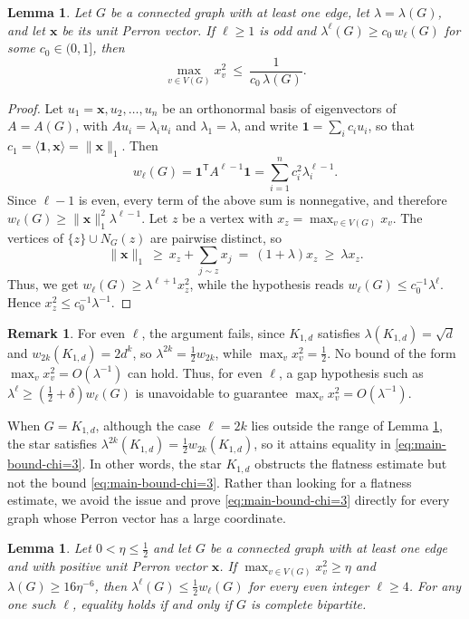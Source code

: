 \documentclass[11pt, a4paper]{article}
\newtheorem{lemma}[theorem]{Lemma}
\theoremstyle{definition}
\newtheorem{remark}{Remark}
\theoremstyle{plain}
\renewcommand{\le}{\leqslant}
\renewcommand{\ge}{\geqslant}
\newcommand{\one}{\mathbf{1}}
\begin{document}
\begin{lemma} 
\label{lem:flat-odd}
Let $G$ be a connected graph with at least one edge, let $\lambda =\lambda (G)$, and let $\bm{x}$ be its unit
Perron vector. If $\ell \ge 1$ is odd and
$\lambda^{\ell} (G)\ge c_0\,w_\ell (G)$ for some
$c_0\in (0,1]$, then
\[
  \max_{v\in V(G)}x_v^2
  \ \le \ \frac{1}{c_0\,\lambda (G)} .
\]
\end{lemma}

\begin{proof}
Let $u_1=\bm{x},u_2,\ldots ,u_n$ be an orthonormal basis
of eigenvectors of $A=A(G)$, with $Au_i=\lambda_iu_i$ and
$\lambda_1=\lambda$, and write $\one =\sum_i c_iu_i$, so
that $c_1=\langle \one ,\bm{x}\rangle
=\lVert \bm{x}\rVert_1$. Then 
\[
  w_\ell (G)=\one^{\mathsf T}A^{\ell -1}\one
  =\sum_{i=1}^{n}c_i^{2}\lambda_i^{\ell -1}.
\] 
Since $\ell -1$ is even, every term of the above sum is
nonnegative, and therefore
$w_\ell (G)\ge \lVert \bm{x}\rVert_1^{2}
\lambda^{\ell -1}$. Let $z$ be a vertex with
$x_z=\max_{v\in V(G)}x_v$. The vertices of
$\{z\}\cup N_G(z)$ are pairwise distinct, so
\[
  \lVert \bm{x}\rVert_1\ \ge\ x_z+\sum_{j\sim z}x_j
  \ =\ (1+\lambda )x_z\ \ge\ \lambda x_z .
\]
Thus, we get $w_\ell (G)\ge \lambda^{\ell +1}x_z^{2}$,
while the hypothesis reads
$w_\ell (G)\le c_0^{-1}\lambda^{\ell}$. Hence
$x_z^{2}\le c_0^{-1}\lambda^{-1}$.
\end{proof}

\begin{remark}
For even $\ell$, the argument fails, since $K_{1,d}$
satisfies $\lambda (K_{1,d})=\sqrt d$ and
$w_{2k}(K_{1,d})=2d^{k}$, so
$\lambda^{2k}=\frac12 w_{2k}$, while
$\max_v x_v^{2}=\frac12$. No bound of the
form $\max_{v}x_v^{2}=O(\lambda^{-1})$ can hold.
Thus, for even $\ell$, a gap hypothesis such as
$\lambda^{\ell}\ge (\frac12+\delta )w_\ell (G)$ is
unavoidable to guarantee $\max_{v} x_v^2 =O(\lambda^{-1})$. \end{remark}

When $G=K_{1,d}$, although the case $\ell =2k$ lies outside the range of Lemma \ref{lem:flat-odd},  
the star satisfies
$\lambda^{2k}(K_{1,d})=\frac12 w_{2k}(K_{1,d})$, so it
attains equality in \eqref{eq:main-bound-chi=3}. 
In other words, the star $K_{1,d}$ obstructs the flatness estimate but not the bound \eqref{eq:main-bound-chi=3}. 
Rather than looking for a flatness estimate, we avoid the issue and prove \eqref{eq:main-bound-chi=3} directly for every graph whose Perron vector has a large coordinate. 


\begin{lemma} 
\label{lem:large-perron}
Let $0<\eta \le \frac12$ and let $G$ be a connected graph
with at least one edge and with positive unit Perron
vector $\bm{x}$. If $\max_{v\in V(G)}x_v^2\ge \eta$ and
$\lambda (G)\ge 16\eta^{-6}$, then
$\lambda^{\ell}(G) \le \frac{1}{2} w_{\ell} (G)$ for every even integer
$\ell \ge 4$. For any one such $\ell$, equality holds if
and only if $G$ is complete bipartite.
\end{lemma}
\end{document}
